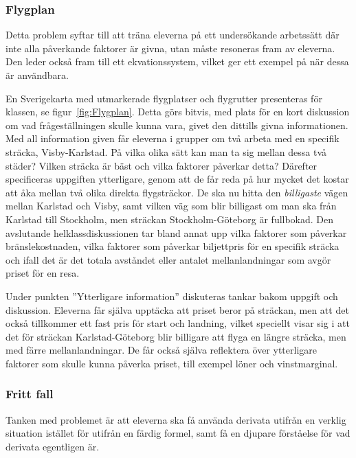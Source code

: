 \subsubsection{Flygplan}
    \label{sec:Flygplan}
    
    \textcolor{lila}{Detta  problem syftar till att träna eleverna på ett undersökande arbetssätt där inte alla påverkande faktorer är givna, utan måste resoneras fram av eleverna. Den leder också fram till ett ekvationssystem, vilket ger ett exempel på när dessa är användbara.}
    
    \textcolor{lila}{En Sverigekarta med utmarkerade flygplatser och flygrutter presenteras för klassen, se figur~\ref{fig:Flygplan}. Detta görs bitvis, med plats för en kort diskussion om vad frågeställningen skulle kunna vara, givet den dittills givna informationen. Med all information given får eleverna i grupper om två arbeta med en specifik sträcka, Visby-Karlstad. På vilka olika sätt kan man ta sig mellan dessa två städer? Vilken sträcka är bäst och vilka faktorer påverkar detta? Därefter specificeras uppgiften ytterligare, genom att de får reda på hur mycket det kostar att åka mellan två olika direkta flygsträckor. De ska nu hitta den \textsl{billigaste} vägen mellan Karlstad och Visby, samt vilken väg som blir billigast om man ska från Karlstad till Stockholm, men sträckan Stockholm-Göteborg är fullbokad. Den avslutande helklassdiskussionen tar bland annat upp vilka faktorer som påverkar bränslekostnaden, vilka faktorer som påverkar biljettpris för en specifik sträcka och ifall det är det totala avståndet eller antalet mellanlandningar som avgör priset för en resa.}
    
    \textcolor{lila}{Under punkten ''Ytterligare information'' diskuteras tankar bakom uppgift och diskussion. Eleverna får själva upptäcka att priset beror på sträckan, men att det också tillkommer ett fast pris för start och landning, vilket speciellt visar sig i att det för sträckan Karlstad-Göteborg blir billigare att flyga en längre sträcka, men med färre mellanlandningar. De får också själva reflektera över ytterligare faktorer som skulle kunna påverka priset, till exempel löner och vinstmarginal.}
    
\subsubsection{Fritt fall}
    \label{sec:FrittFall}
    
    \textcolor{lila}{Tanken med problemet är att eleverna ska få använda derivata utifrån en verklig situation istället för utifrån en färdig formel, samt få en djupare förståelse för vad derivata egentligen är.} 
        
